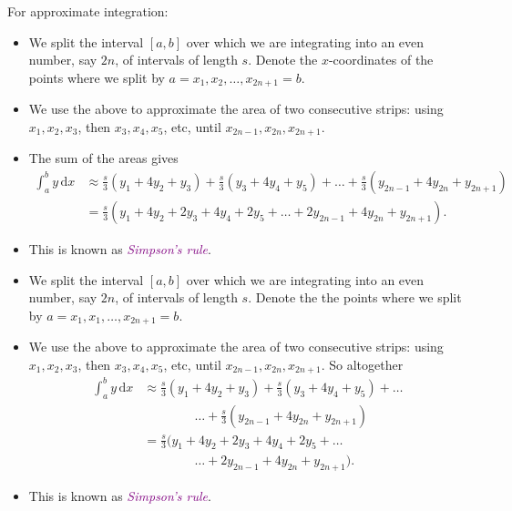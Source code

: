 \documentclass[
  english,
  11pt,
  oneside]{book}
\providecommand{\tightlist}{%
  \setlength{\itemsep}{0pt}\setlength{\parskip}{0pt}}
\theoremstyle{definition}
\theoremstyle{definition}
\theoremstyle{definition}
\theoremstyle{definition}
\theoremstyle{remark}
\begin{document}
\begin{notslides}

For approximate integration:

\begin{itemize}
\tightlist
\item
  We split the interval \([a,b]\) over which we are integrating into an even number, say \(2n\), of intervals of length \(s\). Denote the \(x\)-coordinates of the points where we split by \(a=x_1, x_2,\dots,x_{2n+1}=b\).
\item
  We use the above to approximate the area of two consecutive strips: using \(x_1,x_2,x_3\), then \(x_3,x_4,x_5\), etc, until \(x_{2n-1},x_{2n},x_{2n+1}\).
\item
  The sum of the areas gives
  \begin{align*}
  \int_{a}^{b}y\,\mathrm{d}x& \approx \frac s3\left(y_1+4y_2+y_3\right) + \frac s3\left(y_3+4y_4+y_5\right) + \dots + \frac s3\left(y_{2n-1}+4y_{2n}+y_{2n+1}\right)\\
  &=\frac s3\left(y_1+4y_2+2y_3+4y_4+2y_5+\dots +2y_{2n-1}+4y_{2n}+y_{2n+1}\right).
  \end{align*}
\item
  This is known as \textcolor{purple}{\em Simpson's rule}.
\end{itemize}

\end{notslides}

\begin{slidesonly}

\begin{itemize}
\tightlist
\item
  We split the interval \([a,b]\) over which we are integrating into an even number, say \(2n\), of intervals of length \(s\). Denote the the points where we split by \(a=x_1, x_1,\dots,x_{2n+1}=b\).
\item
  We use the above to approximate the area of two consecutive strips: using \(x_1,x_2,x_3\), then \(x_3,x_4,x_5\), etc, until \(x_{2n-1},x_{2n},x_{2n+1}\). So altogether
  \begin{align*}
  \int_{a}^{b}y\,\mathrm{d}x& \approx \frac s3\left(y_1+4y_2+y_3\right) + \frac s3\left(y_3+4y_4+y_5\right) + \dots\\
  & \qquad\qquad \dots + \frac s3\left(y_{2n-1}+4y_{2n}+y_{2n+1}\right)\\
  &=\frac s3(y_1+4y_2+2y_3+4y_4+2y_5+\dots\\
  & \qquad\qquad \dots +2y_{2n-1}+4y_{2n}+y_{2n+1}).
  \end{align*}
\item
  This is known as \textcolor{purple}{\em Simpson's rule}.
\end{itemize}

\end{slidesonly}
\end{document}
